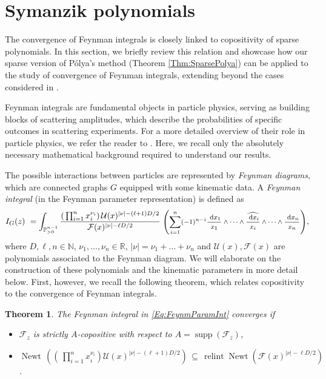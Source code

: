 \documentclass[a4paper,11pt]{amsart}
\newtheorem{theorem}{Theorem}[section]
\theoremstyle{definition}
\DeclareMathOperator{\supp}{supp}
\DeclareMathOperator{\relint}{relint}
\DeclareMathOperator{\Newt}{Newt}
\begin{document}
\section{Symanzik polynomials}
\label{sec:Applications}
\label{sec:Feynman}

The convergence of Feynman integrals is closely linked to copositivity of sparse polynomials.
In this section, we briefly review this relation and showcase how our sparse version of Pólya's method (Theorem \ref{Thm:SparsePolya}) can be applied to the study of convergence of Feynman integrals, extending beyond the cases considered in \cite{SturmfelsTelek}.

Feynman integrals are fundamental objects in particle physics, serving as building blocks of scattering amplitudes, which describe the probabilities of specific outcomes in scattering experiments.
For a more detailed overview of their role in particle physics, we refer the reader to \cite{Weinzierl}.
Here, we recall only the absolutely necessary mathematical background required to understand our results.

The possible interactions between particles are represented by \emph{Feynman diagrams}, which are connected graphs $G$ equipped with some kinematic data. A \emph{Feynman integral} (in the Feynman parameter representation) is defined as
\begin{align}
\label{Eq:FeynmParamInt}
    I_G(z) \,\,= \int_{\mathbb{P}_{>0}^{n-1}} \frac{\left(\,\prod_{i=1}^n x_i^{\nu_i} \right)\mathcal{U}(x)^{|\nu|-(\ell+1) D /2}}{\mathcal{F}(x)^{|\nu| - \ell D / 2}} \; \text{\footnotesize$ \left(\sum_{i=1}^n(-1)^{n-i} \frac{\mathrm{~d} x_1}{x_1} \wedge \cdots \wedge \frac{\widehat{\mathrm{~d} x_i}}{x_i} \wedge \cdots \wedge \frac{\mathrm{~d} x_n}{x_n}\right)$},
\end{align}
where $D,\ell,n \in \mathbb{N}$, $\nu_1, \dots, \nu_n \in \mathbb{R}$, $|\nu| = \nu_1 + \dots + \nu_n$ and $\mathcal{U}(x), \mathcal{F}(x)$ are polynomials associated to the Feynman diagram.
We will elaborate on the construction of these polynomials and the kinematic parameters in more detail below. First, however, we recall the following theorem, which relates copositivity to the convergence of Feynman integrals.

\begin{theorem}
\label{Prop:ConvergInER}
\cite[Theorem 3]{Borinsky} 
The Feynman integral in \eqref{Eq:FeynmParamInt} converges if
\begin{itemize}
\item[(i)] $\mathcal{F}_z$ is strictly $A$-copositive with respect to $A = \supp(\mathcal{F}_z)$, 
    \item[(ii)] $\Newt\, \! \left(  \left(\,\prod_{i=1}^n x_i^{\nu_i} \right) \mathcal{U}(x)^{|\nu|-(\ell+1) D /2} \right)
\, \subseteq \,\relint  \Newt \!  \left(\mathcal{F}(x)^{|\nu| - \ell D / 2} \right)$.
\end{itemize}
\end{theorem}
\end{document}
